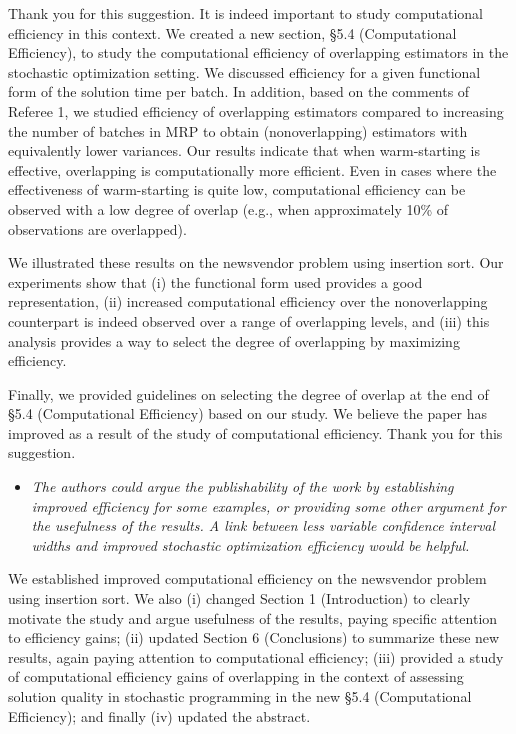 \documentclass[11pt,notitlepage,onecolumn]{article}
\newcommand{\noi}{\noindent}
\begin{document}
\noi 
Thank you for this suggestion. 
It is indeed important to study computational efficiency in this context. 
We created a new section, \S 5.4 (Computational Efficiency), to study the computational efficiency of overlapping estimators in the stochastic optimization setting. 
We discussed efficiency for a given functional form of the solution time per batch. 
In addition, based on the comments of Referee 1, we studied efficiency of overlapping estimators compared to increasing the number of batches in MRP to obtain (nonoverlapping) estimators with equivalently lower variances. 
Our results indicate that when warm-starting is effective, overlapping is computationally more efficient.
Even in cases where the effectiveness of warm-starting is quite low, computational efficiency can be observed with a low degree of overlap (e.g., when approximately 10\% of observations are overlapped).\bigskip 

\noi 
We illustrated these results on the newsvendor problem using insertion sort. 
Our experiments show that (i) the functional form used provides a good representation, (ii) increased computational efficiency over the nonoverlapping counterpart is indeed observed over a range of overlapping levels, and (iii) this analysis provides a way to select the degree of overlapping by maximizing efficiency.\bigskip 
 
\noi
Finally, we provided guidelines on selecting the degree of overlap at the end of \S 5.4 (Computational Efficiency) based on our study. 
We believe the paper has improved as a result of the study of computational efficiency. 
Thank you for this suggestion. 
\medskip 


\begin{itemize}
\item[] \textit{The authors could argue the publishability of the work by establishing improved efficiency for some examples, or providing some other argument for the usefulness of the results.  
A link between less variable confidence interval widths and improved stochastic optimization efficiency would be helpful.}
\end{itemize}

\noi 
We established improved computational efficiency on the newsvendor problem using insertion sort.
We also (i) changed Section 1 (Introduction) to clearly motivate the study and argue usefulness of the results, paying specific attention to efficiency gains; (ii) updated Section 6 (Conclusions) to summarize these new results, again paying attention to computational efficiency; (iii) provided a study of computational efficiency gains of overlapping in the context of assessing solution quality in stochastic programming in the new \S 5.4 (Computational Efficiency); and finally (iv) updated the abstract.  
\medskip
\end{document}
